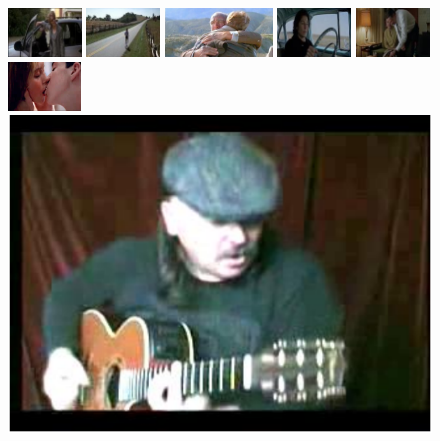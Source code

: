 \documentclass[10pt,twocolumn,letterpaper]{article}
\begin{document}
\begin{figure}[!t]
\begin{center}
\includegraphics[height=1.3cm]{figures/dataset_thumb/hwd/class1.jpg} 
\includegraphics[height=1.3cm]{figures/dataset_thumb/hwd/class2.jpg} 
\includegraphics[height=1.3cm]{figures/dataset_thumb/hwd/class3.jpg}  
\includegraphics[height=1.3cm]{figures/dataset_thumb/hwd/class4.jpg}
\includegraphics[height=1.3cm]{figures/dataset_thumb/hwd/class5.jpg}
\includegraphics[height=1.3cm]{figures/dataset_thumb/hwd/class6.jpg} \\
\includegraphics[scale=0.25]{figures/dataset_thumb/ucf/crop_class1.pdf}

\end{center}
\end{figure}
\end{document}
